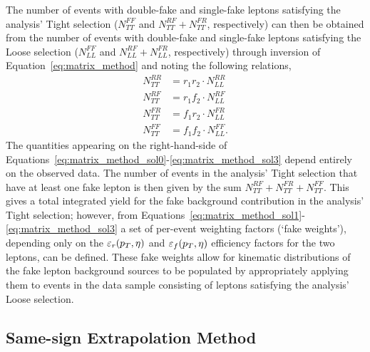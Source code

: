 The number of events with double-fake and single-fake leptons satisfying the analysis' Tight selection
($N_{TT}^{FF}$ and $N_{TT}^{RF} + N_{TT}^{FR}$, respectively) can then be obtained from the
number of events with double-fake and single-fake leptons satisfying the Loose selection
($N_{LL}^{FF}$ and $N_{LL}^{RF} + N_{LL}^{FR}$, respectively) through inversion
of Equation~\ref{eq:matrix_method}  and
noting the following relations,
\begin{align}
    N_{TT}^{RR} &= r_1 r_2 \cdot N_{LL}^{RR}  \label{eq:matrix_method_sol0}\\
    N_{TT}^{RF} &= r_1 f_2 \cdot N_{LL}^{RF}  \label{eq:matrix_method_sol1}\\
    N_{TT}^{FR} &= f_1 r_2 \cdot N_{LL}^{FR}  \label{eq:matrix_method_sol2}\\
    N_{TT}^{FF} &= f_1 f_2 \cdot N_{LL}^{FF}. \label{eq:matrix_method_sol3}
\end{align}
The quantities appearing on the right-hand-side of Equations~\ref{eq:matrix_method_sol0}-\ref{eq:matrix_method_sol3}
depend entirely on the observed data.
The number of events in the analysis' Tight selection that have at least one fake lepton is then given by the sum
$N_{TT}^{RF} + N_{TT}^{FR} + N_{TT}^{FF}$.
This gives a total integrated yield for the fake background contribution in the analysis'
Tight selection; however, from Equations~\ref{eq:matrix_method_sol1}-\ref{eq:matrix_method_sol3}
a set of per-event weighting factors (`fake weights'), depending only on the $\varepsilon_r(p_{T},\eta)$ and
$\varepsilon_f(p_{T},\eta)$ efficiency factors for the two leptons, can be defined.
These fake weights allow for kinematic distributions of the fake lepton background
sources to be populated
by appropriately applying them to events in the data sample consisting of leptons satisfying the analysis' Loose selection.



%
%
\subsection{Same-sign Extrapolation Method}
\label{sec:same_sign_extrap}


